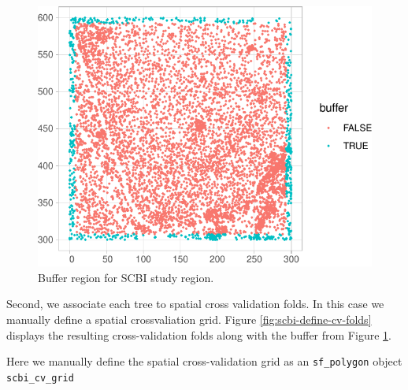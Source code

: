 \documentclass[12pt]{article}
\newenvironment{Shaded}{\begin{snugshade}}{\end{snugshade}}
\newcommand{\DataTypeTok}[1]{\textcolor[rgb]{0.13,0.29,0.53}{#1}}
\newcommand{\DecValTok}[1]{\textcolor[rgb]{0.00,0.00,0.81}{#1}}
\newcommand{\KeywordTok}[1]{\textcolor[rgb]{0.13,0.29,0.53}{\textbf{#1}}}
\newcommand{\NormalTok}[1]{#1}
\newcommand{\OperatorTok}[1]{\textcolor[rgb]{0.81,0.36,0.00}{\textbf{#1}}}
\newcommand{\StringTok}[1]{\textcolor[rgb]{0.31,0.60,0.02}{#1}}
\begin{document}
\begin{figure}

{\centering \includegraphics[width=0.5\linewidth]{Figures/scbi-define-buffer-1} 

}

\caption{Buffer region for SCBI study region.}\label{fig:scbi-define-buffer}
\end{figure}

Second, we associate each tree to spatial cross validation folds. In
this case we manually define a spatial crossvaliation grid. Figure
\ref{fig:scbi-define-cv-folds} displays the resulting cross-validation
folds along with the buffer from Figure \ref{fig:scbi-define-buffer}.

Here we manually define the spatial cross-validation grid as an
\texttt{sf\_polygon} object \texttt{scbi\_cv\_grid}

\begin{Shaded}
\end{Shaded}
\end{document}
